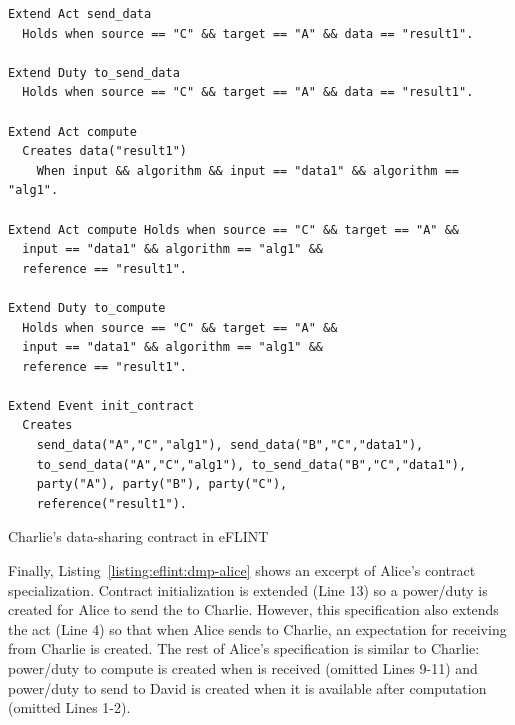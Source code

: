 \begin{listing}[h]
\centering
\begin{tcolorbox}[left=2pt,right=2pt,top=2pt,bottom=2pt,arc=0pt,
                  boxrule=0pt,toprule=1pt,
                  colback=white]
\begin{verbatim}
Extend Act send_data
  Holds when source == "C" && target == "A" && data == "result1".

Extend Duty to_send_data
  Holds when source == "C" && target == "A" && data == "result1".

Extend Act compute
  Creates data("result1")
    When input && algorithm && input == "data1" && algorithm == "alg1".

Extend Act compute Holds when source == "C" && target == "A" &&
  input == "data1" && algorithm == "alg1" &&
  reference == "result1".

Extend Duty to_compute
  Holds when source == "C" && target == "A" &&
  input == "data1" && algorithm == "alg1" &&
  reference == "result1".

Extend Event init_contract
  Creates 
    send_data("A","C","alg1"), send_data("B","C","data1"),
    to_send_data("A","C","alg1"), to_send_data("B","C","data1"), 
    party("A"), party("B"), party("C"), 
    reference("result1").
\end{verbatim}
\end{tcolorbox}
\caption{Charlie's data-sharing contract in eFLINT}
\label{listing:eflint:dmp-charlie}
\end{listing}
Finally, Listing~\ref{listing:eflint:dmp-alice} shows an excerpt of Alice's contract specialization. Contract initialization is extended (Line 13) so a power/duty is created for Alice to send the  to Charlie. However, this specification also extends the  act (Line 4) so that when Alice sends  to Charlie, an expectation for receiving  from Charlie is created. The rest of Alice's specification is similar to Charlie: power/duty to compute  is created when  is received (omitted Lines 9-11) and power/duty to send  to David is created when it is available after computation (omitted Lines 1-2). 


